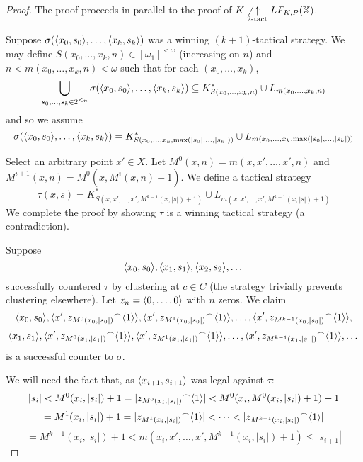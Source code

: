 \begin{proof}
The proof proceeds in parallel to the proof of $K\not\underset{2\text{-tact}}{\uparrow}LF_{K,P}(\mathbb{X})$.

Suppose $\sigma(\langle x_0,s_0\rangle,\dots,\langle x_{k},s_{k}\rangle)$ was a winning $(k+1)$-tactical strategy. We may define $S(x_0,\dots,x_{k},n)\in [\omega_1]^{<\omega}$ (increasing on $n$) and $n<m(x_0,\dots,x_{k},n)<\omega$ such that for each $(x_0,\dots,x_{k})$,
  \[
    \bigcup_{s_0,\dots,s_k \in 2^{\leq n}} \sigma(\langle x_0,s_0\rangle,\dots,\langle x_{k},s_{k}\rangle) \subseteq 
    K^*_{S(x_0,\dots,x_{k},n)} \cup L_{m(x_0,\dots,x_{k},n)}
  \]
and so we assume
  \[
    \sigma(\langle x_0,s_0\rangle,\dots,\langle x_{k},s_{k}\rangle) =
    K^*_{S(x_0,\dots,x_{k},\max(|s_0|,\dots,|s_k|))} \cup L_{m(x_0,\dots,x_{k},\max(|s_0|,\dots,|s_k|))}
  \]

Select an arbitrary point $x' \in X$. Let $M^0(x,n)=m(x,x',\dots,x',n)$ and $M^{i+1}(x,n)=M^0(x,M^i(x,n)+1)$. We define a tactical strategy 
  \[
  \tau(x,s) = K^*_{S(x,x',\dots,x',M^{k-1}(x,|s|)+1)} \cup L_{m(x,x',\dots,x',M^{k-1}(x,|s|)+1)}
  \]
We complete the proof by showing $\tau$ is a winning tactical strategy (a contradiction).

Suppose
\[
\langle x_0, s_0\rangle, \langle x_1, s_1\rangle, \langle x_2, s_2\rangle, \dots
\]
successfully countered $\tau$ by clustering at $c\in C$ (the strategy trivially prevents clustering elsewhere). Let $z_n = \langle0,\dots,0\rangle$ with $n$ zeros. We claim
\[
  \langle x_0, s_0\rangle, 
  \langle x', {z_{M^0(x_0,|s_0|)}}^\frown\langle1\rangle\rangle,
  \langle x', {z_{M^1(x_0,|s_0|)}}^\frown\langle1\rangle\rangle, 
  \dots, 
  \langle x', {z_{M^{k-1}(x_0,|s_0|)}}^\frown\langle1\rangle\rangle,
\]
\[
  \langle x_1, s_1\rangle, 
  \langle x', {z_{M^0(x_1,|s_1|)}}^\frown\langle1\rangle\rangle, 
  \langle x', {z_{M^1(x_1,|s_1|)}}^\frown\langle1\rangle\rangle, 
  \dots, 
  \langle x', {z_{M^{k-1}(x_1,|s_1|)}}^\frown\langle1\rangle\rangle, 
  \dots
\]
is a successful counter to $\sigma$.

We will need the fact that, as $\langle x_{i+1},s_{i+1}\rangle$ was legal against $\tau$:
  \[
    |s_i| <
    M^0(x_i,|s_i|)+1 =
    |{z_{M^0(x_i,|s_i|)}}^\frown\langle1\rangle| <
    M^0(x_i,M^0(x_i,|s_i|)+1)+1 
  \]
  \[
    =
    M^1(x_i,|s_i|)+1 =
    |{z_{M^1(x_i,|s_i|)}}^\frown\langle1\rangle| <
    \dots <
    |{z_{M^{k-1}(x_i,|s_i|)}}^\frown\langle1\rangle| 
  \]
  \[
    =
    M^{k-1}(x_i,|s_i|) + 1 <
    m(x_i,x',\dots,x',M^{k-1}(x_i,|s_i|)+1) \leq
    |s_{i+1}|
  \]


\end{proof}
